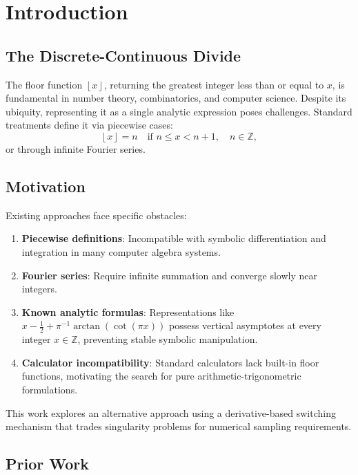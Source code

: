 \documentclass[12pt, a4paper]{article}
\theoremstyle{note}
\newcommand{\floor}[1]{\left\lfloor #1 \right\rfloor}
\newcommand{\Int}{\mathbb{Z}}
\begin{document}
\tableofcontents
\newpage

\section{Introduction}

\subsection{The Discrete-Continuous Divide}

The floor function $\floor{x}$, returning the greatest integer less than or equal to $x$, is fundamental in number theory, combinatorics, and computer science. Despite its ubiquity, representing it as a single analytic expression poses challenges. Standard treatments define it via piecewise cases:
\[
\floor{x} = n \quad \text{if } n \leq x < n+1, \quad n \in \Int,
\]
or through infinite Fourier series.

\subsection{Motivation}

Existing approaches face specific obstacles:
\begin{enumerate}
    \item \textbf{Piecewise definitions}: Incompatible with symbolic differentiation and integration in many computer algebra systems.
    \item \textbf{Fourier series}: Require infinite summation and converge slowly near integers.
    \item \textbf{Known analytic formulas}: Representations like $x - \frac{1}{2} + \pi^{-1}\arctan(\cot(\pi x))$ possess vertical asymptotes at every integer $x \in \Int$, preventing stable symbolic manipulation.
    \item \textbf{Calculator incompatibility}: Standard calculators lack built-in floor functions, motivating the search for pure arithmetic-trigonometric formulations.
\end{enumerate}

This work explores an alternative approach using a derivative-based switching mechanism that trades singularity problems for numerical sampling requirements.

\subsection{Prior Work}
\end{document}
